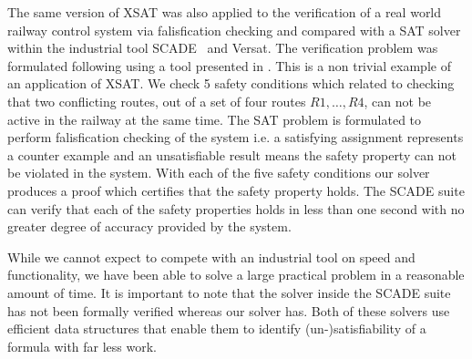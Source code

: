 %
The same version of XSAT was also applied to the verification of a real world railway control system via falisfication checking and compared with a SAT solver within the industrial tool SCADE~\cite{Scade} and Versat. The verification problem was formulated following \cite{MS00} using a tool presented in \cite{KK08}. This is a non trivial example of an application of XSAT. We check 5 safety conditions which related to checking that two conflicting routes, out of a set of four routes $R1, \ldots, R4$, can not be active in the railway at the same time. The SAT problem is formulated to perform falisfication checking of the system i.e. a satisfying assignment represents a counter example and an unsatisfiable result means the safety property can not be violated in the system. With each of the five safety conditions our solver produces a proof which certifies that the safety property holds. The SCADE suite can verify that each of the safety properties holds in less than one second with no greater degree of accuracy provided by the system.

\begin{comment} 
The safety condition SC1 results in a SAT problem containing 8166 variables and 14716 clauses. It is unsatisfiable due to under-specification of the railway interlocking program which does not include all physical invariants. Out of 100 safety conditions available for the interlocking program, SC1 is the hardest to verify; most of the safety conditions are easily satisfiable. Our solver produces a proof showing that the safety condition is unsatisfiable, whereas the SCADE suite produces a counter example trace showing a sequence of states and transitions that lead to the safety condition being falsified. The results can be found in Table~\ref{tab:scade}.
\end{comment}
%
\begin{comment}
\begin{table}%
\caption{Performance compared to SCADE}
\label{tab:scade}
\begin{center}
{\small
\begin{tabular}{cccc}
  \toprule
  \text{Formula} & \multicolumn{2}{c}{\text{$\forallnc$ compiled}}  & \text{SCADE} \\ \cmidrule{2-3}
  &  \text{Yes/No} & \text{Witness} & \text{SAT/Counter Example}  \\ \midrule
  SC1 & 8s & 12s &  $<$1s \\ \bottomrule
\end{tabular}
}
\end{center}
\end{table}
\end{comment}
%
While we cannot expect to compete with an industrial tool on speed and functionality, we have been able to solve a large practical problem in a reasonable amount of time. It is important to note that the solver inside the SCADE suite has not been formally verified whereas our solver has. Both of these solvers use efficient data structures that enable them to identify (un-)satisfiability of a formula with far less work.   

